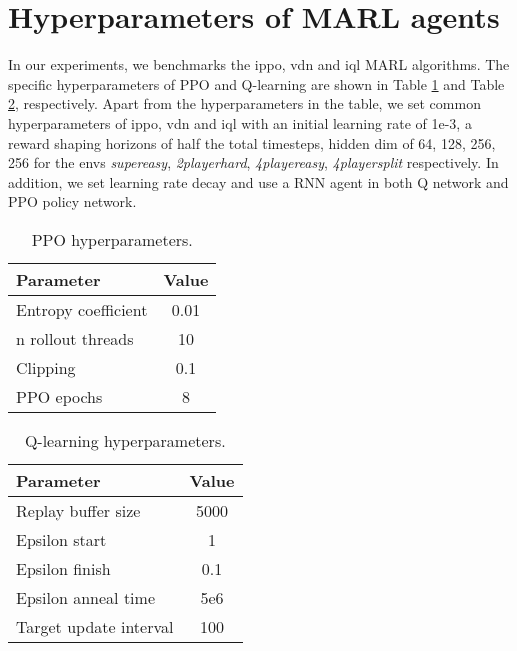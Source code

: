 \section{Hyperparameters of MARL agents}\label{appendix:hyper}
In our experiments, we benchmarks the ippo, vdn and iql MARL algorithms. The specific hyperparameters of PPO and Q-learning are shown in Table \ref{tab:ippo_hyper} and Table \ref{tab:qlearning_hyper}, respectively. Apart from the hyperparameters in the table, we set common hyperparameters of ippo, vdn and iql with an initial learning rate of 1e-3, a reward shaping horizons of half the total timesteps, hidden dim of 64, 128, 256, 256 for the envs \textit{supereasy}, \textit{2playerhard}, \textit{4playereasy}, \textit{4playersplit} respectively. In addition, we set learning rate decay and use a RNN agent in both Q network and PPO policy network. 
\begin{table}[htb]
\centering
\caption{PPO hyperparameters. }
\label{tab:ippo_hyper}
\setlength{\tabcolsep}{3.5mm}
\begin{tabular}{lc}
\toprule
\textbf{Parameter} & \textbf{Value} \\
\midrule
Entropy coefficient        & 0.01         \\
n rollout threads                & 10        \\
Clipping                  & 0.1       \\
PPO epochs                & 8 \\
\bottomrule
\end{tabular}
\end{table}

\begin{table}[htb]
\centering
\caption{Q-learning hyperparameters. }
\label{tab:qlearning_hyper}
\setlength{\tabcolsep}{3.5mm}
\begin{tabular}{lc}
\toprule
\textbf{Parameter} & \textbf{Value} \\
\midrule
Replay buffer size       & 5000         \\
Epsilon start                   & 1        \\
Epsilon finish                     & 0.1        \\
Epsilon anneal time                & 5e6        \\
Target update interval                  & 100       \\
\bottomrule
\end{tabular}
\end{table}









